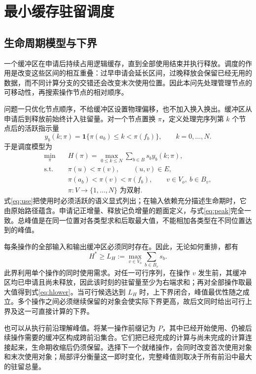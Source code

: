 \section{最小缓存驻留调度}
\subsection{生命周期模型与下界}
一个缓冲区在申请后持续占用逻辑缓存，直到全部使用结束并执行释放。调度的作用是改变这些区间的相互重叠：过早申请会延长区间，过晚释放会保留已经无用的数据，而不同计算分支的交错还会改变末次使用位置。因此本问先处理管理节点的可移动性，再搜索操作节点的相对顺序。

问题一只优化节点顺序，不给缓冲区设置物理偏移，也不加入换入换出。缓冲区从申请后到释放前始终计入驻留量。对一个节点置换 $\pi$，定义处理完序列第 $k$ 个节点后的活跃指示量
\begin{equation}
y_b(k;\pi)=\mathbf 1\{\pi(a_b)\le k<\pi(f_b)\},\qquad k=0,\ldots,N.
\end{equation}
于是调度模型为
\begin{align}
\min_{\pi}\quad&H(\pi)=\max_{0\le k\le N}\sum_{b\in B}s_b y_b(k;\pi),\label{eq:peak}\\
\text{s.t.}\quad&\pi(u)<\pi(v),\qquad (u,v)\in E,\label{eq:topo}\\
&\pi(a_b)<\pi(v)<\pi(f_b),\qquad v\in V_o,\ b\in B_v,\label{eq:use}\\
&\pi:V\longrightarrow\{1,\ldots,N\}\text{ 为双射}.\nonumber
\end{align}
式\eqref{eq:use}把使用时必须活跃的语义显式列出；在输入依赖充分描述生命期时，它由原始路径蕴含。申请记正增量、释放记负增量的题面定义，与式\eqref{eq:peak}完全一致。总峰值是在同一位置对各类型求和后取最大值，不能相加各类型在不同位置达到的峰值。

每条操作的全部输入和输出缓冲区必须同时存在。因此，无论如何重排，都有
\begin{equation}
H^*\ge L_H:=\max_{v\in V_o}\sum_{b\in B_v}s_b.\label{eq:hlower}
\end{equation}
此界利用单个操作的同时使用需求。对任一可行序列，在操作 $v$ 发生前，其缓冲区均已申请且尚未释放，因此该时刻的驻留量至少为右端求和；再对全部操作取最大值得到式\eqref{eq:hlower}。当可行候选达到 $L_H$ 时，上下界闭合，峰值最优性随之成立。多个操作之间必须继续保留的对象会使实际下界更高，故后文同时给出可行上界及这一可直接计算的下界。

也可以从执行前沿理解峰值。将某一操作前缀记为 $P$，其中已经开始使用、仍被后续操作需要的缓冲区构成跨前沿集合。它们把已经完成的计算与尚未完成的计算连接起来，生命期收缩后仍须保留。选择下一个就绪操作，会同时改变首次使用对象和末次使用对象；局部评分衡量这一即时变化，完整峰值则取决于所有前沿中最大的驻留总量。


